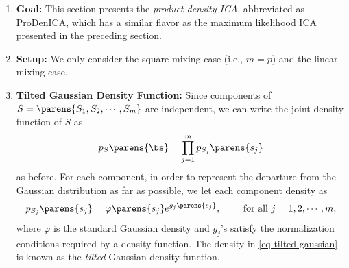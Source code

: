 \documentclass[12pt]{article}
\begin{document}
\begin{enumerate}[label=\textbf{\arabic*.}]
	
	\item \textbf{Goal:} This section presents the \emph{product density ICA}, abbreviated as ProDenICA, which has a similar flavor as the maximum likelihood ICA presented in the preceding section. 
	
	\item \textbf{Setup:} We only consider the square mixing case (i.e., $m = p$) and the linear mixing case. 
	
	\item \textbf{Tilted Gaussian Density Function:} Since components of $S = \parens{S_1, S_2, \cdots, S_m}$ are independent, we can write the joint density function of $S$ as 
	\begin{align*}
		p_S \parens{\bs} = \prod_{j=1}^m p_{S_j} \parens{s_j}
	\end{align*}
	as before. For each component, in order to represent the departure from the Gaussian distribution as far as possible, we let each component density as 
	\begin{align}\label{eq-tilted-gaussian}
		p_{S_j} \parens{s_j} = \varphi \parens{s_j} e^{g_j \parens{s_j}}, \qquad \text{ for all } j = 1, 2, \cdots, m, 
	\end{align}
	where $\varphi$ is the standard Gaussian density and $g_j$'s satisfy the normalization conditions required by a density function. The density in \eqref{eq-tilted-gaussian} is known as the \emph{tilted} Gaussian density function. 
	

\end{enumerate}
\end{document}
